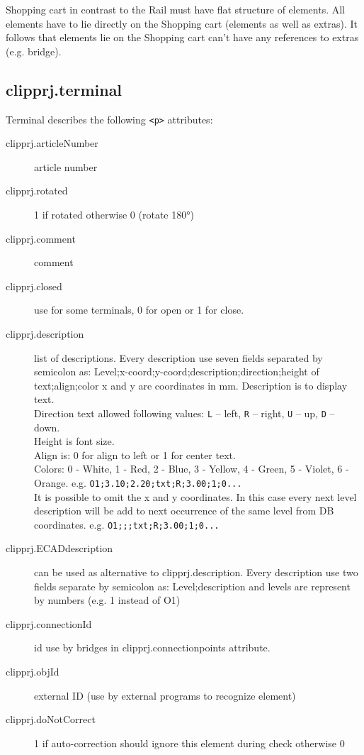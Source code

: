 \documentclass[%
	a4paper,
	oneside,
	listof=numbered,
	parskip=half,
	headsepline=true,
	footsepline=true,
	]{scrbook}
\begin{document}
Shopping cart in contrast to the Rail must have flat structure of elements. All elements have to lie directly on the Shopping cart (elements as well as extras). It follows that elements lie on the Shopping cart can’t have any references to extras (e.g. bridge). 

\subsection{clipprj.terminal} 
 
Terminal describes the following \verb|<p>| attributes: 

\begin{description}
	\item[clipprj.articleNumber] article number 
	\item[clipprj.rotated] 1 if rotated otherwise 0 (rotate 180°) 
	\item[clipprj.comment] comment 
	\item[clipprj.closed] use for some terminals, 0 for open or 1 for close. 
	\item[clipprj.description] list of descriptions. Every description use seven fields separated by semicolon as: Level;x-coord;y-coord;description;direction;height of text;align;color x and y are coordinates in mm.
	Description is to display text.\\
	Direction text allowed following values: 
	\verb|L| – left, \verb|R| – right, \verb|U| – up, \verb|D| – down.\\
	Height is font size.\\
	Align is: 0 for align to left or 1 for center text.\\
	Colors: 0 - White, 1 - Red, 2 - Blue, 3 - Yellow, 4 - Green, 5 - Violet, 6 - Orange. e.g. \verb|O1;3.10;2.20;txt;R;3.00;1;0...|\\
	It is possible to omit the x and y coordinates. In this case every next level description will be add to next occurrence of the same level from DB coordinates. e.g. \verb|O1;;;txt;R;3.00;1;0...|
	\item[clipprj.ECADdescription] can be used as alternative to clipprj.description. Every description use two fields separate by semicolon as: Level;description and levels are represent by numbers (e.g. 1 instead of O1) 
	\item[clipprj.connectionId] id use by bridges in clipprj.connectionpoints attribute. 
	\item[clipprj.objId] external ID (use by external programs to recognize element) 
	\item[clipprj.doNotCorrect] 1 if auto-correction should ignore this element during check otherwise 0 
\end{description}
\end{document}
